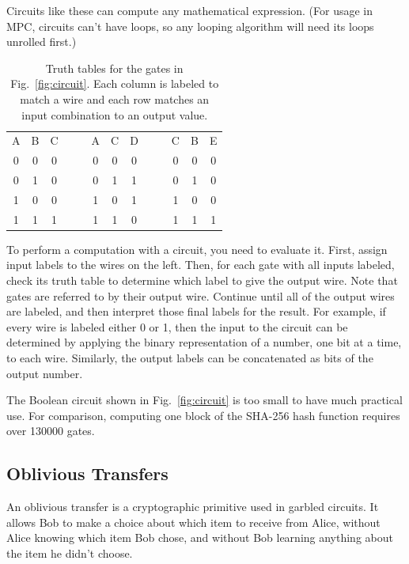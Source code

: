 Circuits like these can compute any mathematical expression. (For usage in MPC, circuits can't have loops, so any looping algorithm will need its loops unrolled first.)

\begin{table}[ht]
	\centering %
	\begin{tabular}{cc|c   cc   cc|c   cc   cc|c}
		A & B & C   &&&   A & C & D   &&&   C & B & E \\
		\cmidrule{1-3}    \cmidrule{6-8}    \cmidrule{11-13}
		0 & 0 & 0   &&&   0 & 0 & 0   &&&   0 & 0 & 0 \\
		0 & 1 & 0   &&&   0 & 1 & 1   &&&   0 & 1 & 0 \\
		1 & 0 & 0   &&&   1 & 0 & 1   &&&   1 & 0 & 0 \\
		1 & 1 & 1   &&&   1 & 1 & 0   &&&   1 & 1 & 1 \\
	\end{tabular}
	\caption{Truth tables for the gates in Fig.~\ref{fig:circuit}. Each column is labeled to match a wire and each row matches an input combination to an output value.}%
	\label{tab:truth-table}
\end{table}

To perform a computation with a circuit, you need to evaluate it. First, assign input labels to the wires on the left. Then, for each gate with all inputs labeled, check its truth table to determine which label to give the output wire. Note that gates are referred to by their output wire. Continue until all of the output wires are labeled, and then interpret those final labels for the result. For example, if every wire is labeled either 0 or 1, then the input to the circuit can be determined by applying the binary representation of a number, one bit at a time, to each wire. Similarly, the output labels can be concatenated as bits of the output number.

The Boolean circuit shown in Fig.~\ref{fig:circuit} is too small to have much practical use. For comparison, computing one block of the SHA-256 hash function requires over 130000 gates.\cite{bristol}

\subsection{Oblivious Transfers}
An oblivious transfer is a cryptographic primitive used in garbled circuits. It allows Bob to make a choice about which item to receive from Alice, without Alice knowing which item Bob chose, and without Bob learning anything about the item he didn't choose. 

